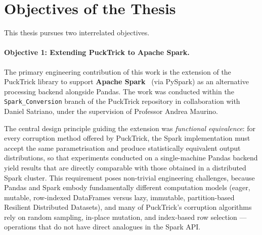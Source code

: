 \section{Objectives of the Thesis}
\label{sec:objectives}

This thesis pursues two interrelated objectives.

\paragraph{Objective 1: Extending PuckTrick to Apache Spark.}
The primary engineering contribution of this work is the extension of the
PuckTrick library to support \textbf{Apache Spark}~\cite{zaharia2016apache}
(via PySpark) as an alternative processing backend alongside Pandas.  The work
was conducted within the \texttt{Spark\_Conversion} branch of the PuckTrick
repository in collaboration with Daniel Satriano, under the supervision of
Professor Andrea Maurino.

The central design principle guiding the extension was \emph{functional
equivalence}: for every corruption method offered by PuckTrick, the Spark
implementation must accept the same parametrisation and produce statistically
equivalent output distributions, so that experiments conducted on a
single-machine Pandas backend yield results that are directly comparable with
those obtained in a distributed Spark cluster.  This requirement poses
non-trivial engineering challenges, because Pandas and Spark embody
fundamentally different computation models (eager, mutable, row-indexed
DataFrames versus lazy, immutable, partition-based Resilient Distributed
Datasets), and many of PuckTrick's corruption algorithms rely on random
sampling, in-place mutation, and index-based row selection — operations that do
not have direct analogues in the Spark API.

